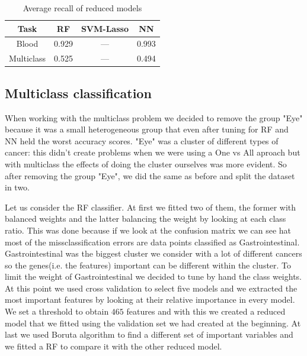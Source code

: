 \documentclass[a4paper,11pt, oneside]{article}  %
\begin{document}
	\begin{table}[h!]
		\caption{Average recall of reduced models}
		\centering
		\begin{tabular}{c c c c}
			\hline\hline
			Task & RF & SVM-Lasso & NN \\ [0.5ex] %
			\hline
			Blood & 0.929 & --- & 0.993 \\
			Multiclass & 0.525 &  --- & 0.494 \\ [1ex]
			\hline
		\end{tabular}
		\label{table:reduced_models}
	\end{table}
	
	
	
	
	
	\subsection{Multiclass classification}
	When working with the multiclass problem we decided to remove the group "Eye" because it was a small heterogeneous group that even after tuning for RF and NN held the worst accuracy scores. "Eye" was a cluster of different types of cancer: this didn't create problems when we were using a One vs All aproach but with multiclass the effects of doing the cluster ourselves was more evident.  
	So after removing the group "Eye", we did the same as before and split the dataset in two.
	
	Let us consider the RF classifier. At first we fitted two of them, the former with balanced weights and the latter balancing the weight by looking at each class ratio. This was done because if we look at the confusion matrix we can see hat most of the missclassification errors are data points classified as Gastrointestinal. Gastrointestinal was the biggest cluster we consider with a lot of different cancers so the genes(i.e. the features) important can be different within the cluster. To limit the weight of Gastrointestinal we decided to tune by hand the class weights. At this point we used cross validation to select five models and we extracted the most important features by looking at their relative importance in every model. We set a threshold to obtain  $465$ features and with this we created a reduced model that we fitted using the validation set we had created at the beginning. At last we used Boruta algorithm to find a different set of important variables and we fitted a RF to compare it with the other reduced model.
	
\end{document}
